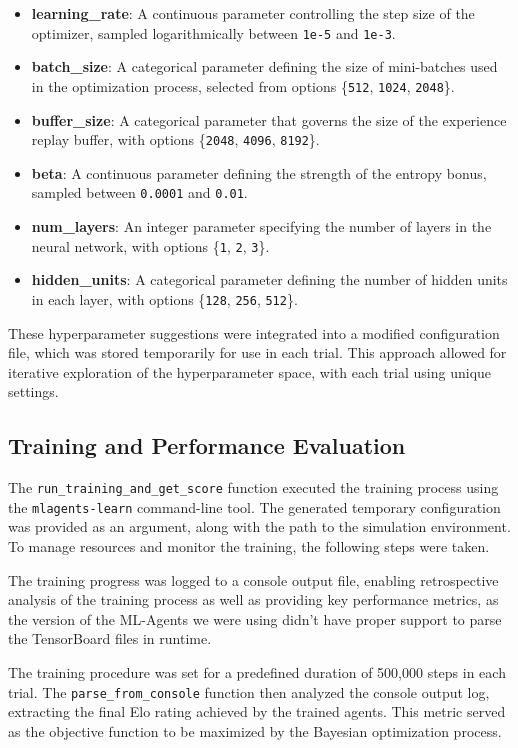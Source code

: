 \documentclass{LSkill}
\begin{document}
\begin{itemize}
    \item \textbf{learning\_rate}: A continuous parameter controlling the step size of the optimizer, sampled logarithmically between \texttt{1e-5} and \texttt{1e-3}.
    \item \textbf{batch\_size}: A categorical parameter defining the size of mini-batches used in the optimization process, selected from options \{\texttt{512}, \texttt{1024}, \texttt{2048}\}.
    \item \textbf{buffer\_size}: A categorical parameter that governs the size of the experience replay buffer, with options \{\texttt{2048}, \texttt{4096}, \texttt{8192}\}.
    \item \textbf{beta}: A continuous parameter defining the strength of the entropy bonus, sampled between \texttt{0.0001} and \texttt{0.01}.
    \item \textbf{num\_layers}: An integer parameter specifying the number of layers in the neural network, with options \{\texttt{1}, \texttt{2}, \texttt{3}\}.
    \item \textbf{hidden\_units}: A categorical parameter defining the number of hidden units in each layer, with options \{\texttt{128}, \texttt{256}, \texttt{512}\}.
\end{itemize}

These hyperparameter suggestions were integrated into a modified configuration file, which was stored temporarily for use in each trial. This approach allowed for iterative exploration of the hyperparameter space, with each trial using unique settings.
\subsection{Training and Performance Evaluation}

The \texttt{run\_training\_and\_get\_score} function executed the training process using the \texttt{mlagents-learn} command-line tool. The generated temporary configuration was provided as an argument, along with the path to the simulation environment. To manage resources and monitor the training, the following steps were taken.

The training progress was logged to a console output file, enabling retrospective analysis of the training process as well as providing key performance metrics, as the version of the ML-Agents we were using didn’t have proper support to parse the TensorBoard files in runtime.

The training procedure was set for a predefined duration of 500,000 steps in each trial. The \texttt{parse\_from\_console} function then analyzed the console output log, extracting the final Elo rating achieved by the trained agents. This metric served as the objective function to be maximized by the Bayesian optimization process.
\end{document}
